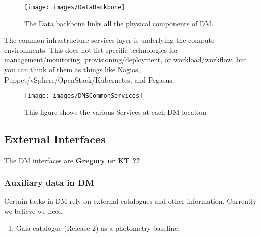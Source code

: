 \begin{figure}[htbp]
\begin{center}
 \texttt{[image: images/DataBackbone]}
\caption{The Data backbone links all the physical components of DM. \label{fig:databb}}
\end{center}
\end{figure}

The common infrastructure services layer is underlying the compute environments. 
This does not list  specific technologies for management/monitoring,
provisioning/deployment, or workload/workflow, but you can think of them
as things like Nagios, Puppet/vSphere/OpenStack/Kubernetes, and Pegasus.

\begin{figure}[htbp]
\begin{center}
 \texttt{[image: images/DMSCommonServices]}
\caption{This figure shows the various Services at each DM location \label{fig:dcs}}
\end{center}
\end{figure}



\subsection{External Interfaces}
The DM interfaces are {\bf Gregory or KT ??}
\subsubsection{Auxiliary data in DM}
Certain tasks in DM rely on external catalogues and other information. Currently we believe we need:
\begin{enumerate}
		        \item Gaia catalogue (Release 2) as a photometry baseline.
		\end{enumerate}
